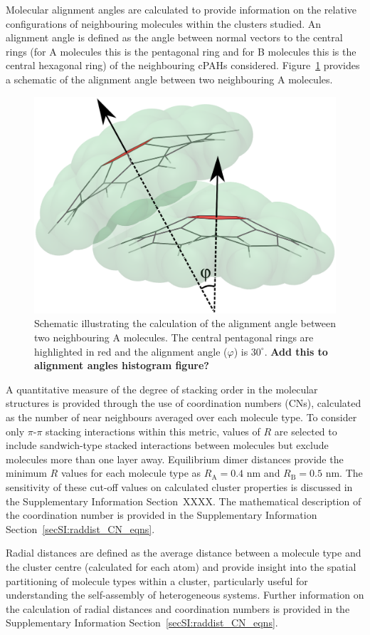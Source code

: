 Molecular alignment angles are calculated to provide information on the relative configurations of neighbouring molecules within the clusters studied. An alignment angle is defined as the angle between normal vectors to the central rings (for A molecules this is the pentagonal ring and for B molecules this is the central hexagonal ring) of the neighbouring cPAHs considered.  Figure~\ref{fig:alignmentangle_schematic} provides a schematic of the alignment angle between two neighbouring A molecules.
%
\begin{figure}[!tbh]
\centering
\includegraphics[width=0.25\linewidth]{Figures/alignment_angle_schematic.eps}
\caption{Schematic illustrating the calculation of the alignment angle between two neighbouring A molecules. The central pentagonal rings are highlighted in red and the alignment angle ($\varphi$) is $30^{\circ}$. \textbf{Add this to alignment angles histogram figure?}}
\label{fig:alignmentangle_schematic}
\end{figure}
%

A quantitative measure of the degree of stacking order in the molecular structures is provided through the use of coordination numbers (CNs), calculated as the number of near neighbours averaged over each molecule type. To consider only $\pi$-$\pi$ stacking interactions within this metric, values of $R$ are selected to include sandwich-type stacked interactions between molecules but exclude molecules more than one layer away. Equilibrium dimer distances provide the minimum $R$ values for each molecule type as $R_{\text{A}} = 0.4$ nm and $R_{\text{B}} = 0.5$ nm. The sensitivity of these cut-off values on calculated cluster properties is discussed in the Supplementary Information Section~XXXX. The mathematical description of the coordination number is provided in the Supplementary Information Section~\ref{secSI:raddist_CN_eqns}.

Radial distances are defined as the average distance between a molecule type and the cluster centre (calculated for each atom) and provide insight into the spatial partitioning of molecule types within a cluster, particularly useful for understanding the self-assembly of heterogeneous systems. Further information on the calculation of radial distances and coordination numbers is provided in the Supplementary Information Section~\ref{secSI:raddist_CN_eqns}.

